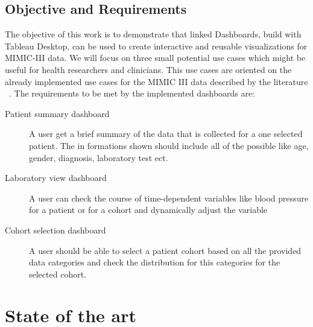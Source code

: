 \documentclass[aac]{iosart2x}
\begin{document}
\subsection{Objective and Requirements}\label{s1.2}
%
The objective of this work is to demonstrate that linked Dashboards, build with Tableau Desktop, can be used to create interactive and reusable visualizations for MIMIC-III data. We will focus on three small potential use cases which might be useful for health researchers and clinicians. This use cases are oriented on the already implemented use cases for the MIMIC III data described by the literature ~\cite{Lee.2016, Festag.2019}.
The requirements to be met by the implemented dashboards are:
\begin{description}
\item[Patient summary dashboard] A user get a brief summary of the data that is collected for a one selected patient. The in formations shown should include all of the possible like age, gender, diagnosis, laboratory test ect.
\item[Laboratory view dashboard] A user can check the course of time-dependent variables like blood pressure for a patient or for a cohort and dynamically adjust the variable
\item[Cohort selection dashboard] A user should be able to select a patient cohort based on all the provided data categories and check the distribution for this categories for the selected cohort.
\end{description}


\section{State of the art}\label{s2}
%
\end{document}
